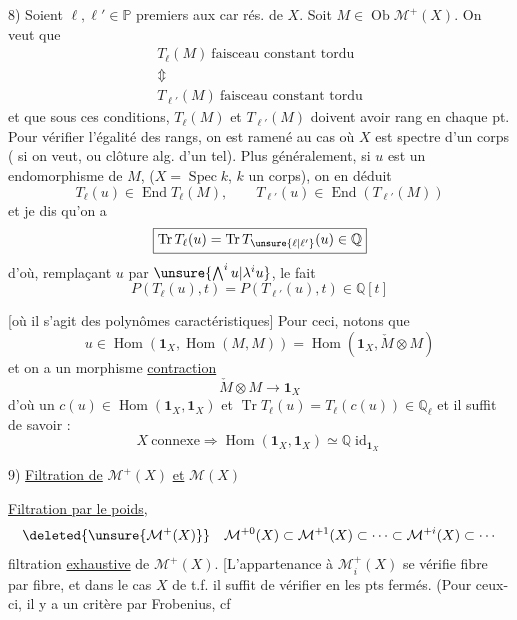 8) Soient $\ell,\ell'\in\mathbb{P}$ premiers aux car rés.
de $X$. Soit $M\in\operatorname{Ob}\mathcal{M}^+(X)$. On veut
que
\[
\begin{array}{c}
T_\ell(M)\ \text{faisceau constant tordu}\\
\Updownarrow\\
T_{\ell'}(M)\ \text{faisceau constant tordu}
\end{array}
\]
et que sous ces conditions, $T_\ell(M)$ et
$T_{\ell'}(M)$ doivent avoir  rang en chaque
pt. Pour vérifier l'égalité des rangs, on
est ramené au cas où $X$ est  spectre d'un
corps ( si on veut,  ou clôture alg.
d'un tel). Plus généralement, si
$u$ est un endomorphisme de $M$,
($X=\operatorname{Spec}k$, $k$ un corps), on en déduit
\[
T_\ell(u)\in\operatorname{End}T_\ell(M),\qquad
T_{\ell'}(u)\in\operatorname{End}(T_{\ell'}(M))
\]
et je dis qu'on a
\[
\boxed{\operatorname{Tr}T_\ell(u)=\operatorname{Tr}T_{\unsure{\ell|\ell'}}(u)
\in\mathbb{Q}}
\]
d'où, remplaçant $u$ par $\unsure{\bigwedge^i u|\lambda^i u}$, le fait
\[
\boxed{P(T_\ell(u),t)=P(T_{\ell'}(u),t)\in\mathbb{Q}[t]}
\]

[où il s'agit des polynômes caractéristiques]
Pour ceci, notons que
\[
u\in\operatorname{Hom}(\mathbf1_X,\operatorname{Hom}(M,M))
=\operatorname{Hom}(\mathbf1_X,\check M\otimes M)
\]
et on a un morphisme \uline{contraction}
\[
\check M\otimes M\longrightarrow\mathbf1_X
\]
d'où un $c(u)\in\operatorname{Hom}(\mathbf1_X,\mathbf1_X)$
et  $\operatorname{Tr}T_\ell(u)=T_\ell(c(u))\in\mathbb{Q}_\ell$
et il suffit de savoir :
\[
\boxed{X\ \text{connexe}\Longrightarrow
\operatorname{Hom}(\mathbf1_X,\mathbf1_X)\simeq\mathbb{Q}\operatorname{id}_{\mathbf1_X}}
\]

9) \uline{Filtration de} $\mathcal{M}^+(X)$ \uline{et} $\mathcal{M}(X)$

 \uline{Filtration par le poids},
\[
\deleted{\unsure{\mathcal{M}^+(X)}}\quad
\mathcal{M}^{+0}(X)\subset \mathcal{M}^{+1}(X)\subset\cdots\subset \mathcal{M}^{+i}(X)\subset\cdots
\]
filtration \uline{exhaustive} de $\mathcal{M}^+(X)$. [L'appartenance
à $\mathcal{M}_i^+(X)$ se vérifie fibre par fibre,
et dans le cas $X$ de t.f.  il suffit de
vérifier en les pts fermés. (Pour ceux-
ci, il y a un critère par Frobenius, cf

